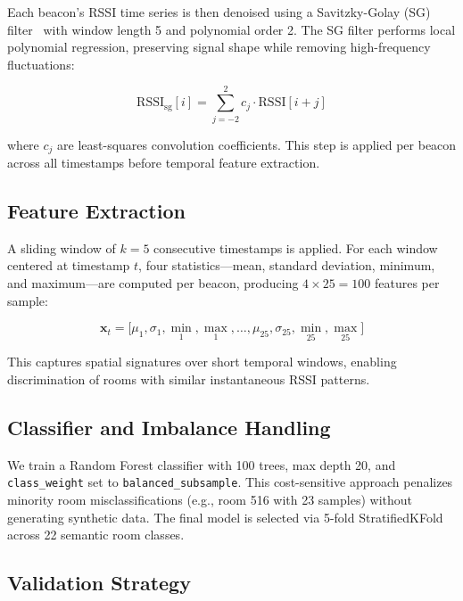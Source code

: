 \documentclass{iopconfser}
\begin{document}
Each beacon's RSSI time series is then denoised using a Savitzky-Golay (SG) filter~\cite{savitzky1964} with window length 5 and polynomial order 2. The SG filter performs local polynomial regression, preserving signal shape while removing high-frequency fluctuations:

\begin{equation}
\text{RSSI}_{\text{sg}}[i] = \sum_{j=-2}^{2} c_j \cdot \text{RSSI}[i+j]
\label{eq:sg_impl}
\end{equation}

\noindent where $c_j$ are least-squares convolution coefficients. This step is applied per beacon across all timestamps before temporal feature extraction.

\subsection{Feature Extraction}

A sliding window of $k = 5$ consecutive timestamps is applied. For each window centered at timestamp $t$, four statistics---mean, standard deviation, minimum, and maximum---are computed per beacon, producing $4 \times 25 = 100$ features per sample:

\begin{equation}
\mathbf{x}_t = \big[\mu_1, \sigma_1, \min_1, \max_1, \dots, \mu_{25}, \sigma_{25}, \min_{25}, \max_{25}\big]
\label{eq:features}
\end{equation}

\noindent This captures spatial signatures over short temporal windows, enabling discrimination of rooms with similar instantaneous RSSI patterns.

\subsection{Classifier and Imbalance Handling}

We train a Random Forest classifier with 100 trees, max depth 20, and \texttt{class\_weight} set to \texttt{balanced\_subsample}. This cost-sensitive approach penalizes minority room misclassifications (e.g., room 516 with 23 samples) without generating synthetic data. The final model is selected via 5-fold StratifiedKFold across 22 semantic room classes.

\subsection{Validation Strategy}
\end{document}
